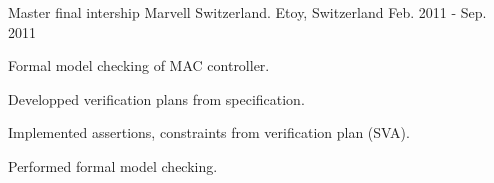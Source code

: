 \begin{cventries}
  \cventry
    {Master final intership} %
    {Marvell Switzerland.} %
    {Etoy, Switzerland} %
    {Feb. 2011 - Sep. 2011} %
    {
      \begin{cvitems} %
        \item {Formal model checking of MAC controller.}
        \item {Developped verification plans from specification.}
        \item {Implemented assertions, constraints from verification plan (SVA).}
        \item {Performed formal model checking.}
      \end{cvitems}
    }

\end{cventries}
